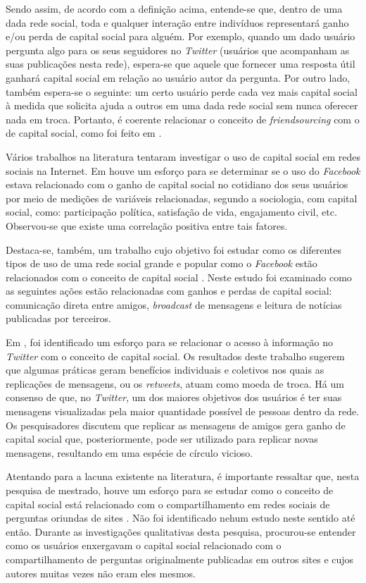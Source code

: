 Sendo assim, de acordo com a definição acima, entende-se que, dentro de uma dada rede social, toda e qualquer interação entre indivíduos representará ganho e/ou perda de capital social para alguém. Por exemplo, quando um dado usuário pergunta algo para os seus seguidores no \textit{Twitter} (usuários que acompanham as suas publicações nesta rede), espera-se que aquele que fornecer uma resposta útil ganhará capital social em relação ao usuário autor da pergunta. Por outro lado, também espera-se o seguinte: um certo usuário perde cada vez mais capital social à medida que solicita ajuda a outros em uma dada rede social sem nunca oferecer nada em troca. Portanto, é coerente relacionar o conceito de \textit{friendsourcing} com o de capital social, como foi feito em \cite{rzeszotarski2014estimating}.

Vários trabalhos na literatura tentaram investigar o uso de capital social em redes sociais na Internet. Em \cite{valenzuela2009there} houve um esforço para se determinar se o uso do \textit{Facebook} estava relacionado com o ganho de capital social no cotidiano dos seus usuários por meio de medições de variáveis relacionadas, segundo a sociologia, com capital social, como: participação política, satisfação de vida, engajamento civil, etc. Observou-se que existe uma correlação positiva entre tais fatores.

Destaca-se, também, um trabalho cujo objetivo foi estudar como os diferentes tipos de uso de uma rede social grande e popular como o \textit{Facebook} estão relacionados com o conceito de capital social \cite{Burke:2011:SCF:1978942.1979023}. Neste estudo foi examinado como as seguintes ações estão relacionadas com ganhos e perdas de capital social: comunicação direta entre amigos, \textit{broadcast} de mensagens e leitura de notícias publicadas por terceiros. 

Em \cite{recuero2012economia}, foi identificado um esforço para se relacionar o acesso à informação no \textit{Twitter} com o conceito de capital social. Os resultados deste trabalho sugerem que algumas práticas geram benefícios individuais e coletivos nos quais as replicações de mensagens, ou os \textit{retweets}, atuam como moeda de troca. Há um consenso de que, no \textit{Twitter}, um dos maiores objetivos dos usuários é ter suas mensagens visualizadas pela maior quantidade possível de pessoas dentro da rede. Os pesquisadores discutem que replicar as mensagens de amigos gera ganho de capital social que, posteriormente, pode ser utilizado para replicar novas mensagens, resultando em uma espécie de círculo vicioso.

Atentando para a lacuna existente na literatura, é importante ressaltar que, nesta pesquisa de mestrado, houve um esforço para se estudar como o conceito de capital social está relacionado com o compartilhamento em redes sociais de perguntas oriundas de sites \qanospace. Não foi identificado nehum estudo neste sentido até então. Durante as investigações qualitativas desta pesquisa, procurou-se entender como os usuários enxergavam o capital social relacionado com o compartilhamento de perguntas originalmente publicadas em outros sites e cujos autores muitas vezes não eram eles mesmos.